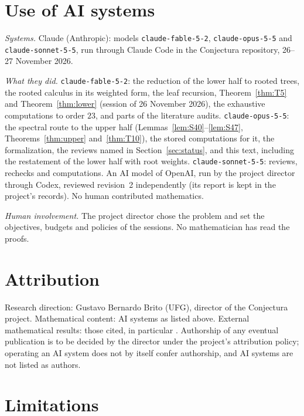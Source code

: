 \documentclass[11pt]{amsart}
\theoremstyle{definition}
\theoremstyle{remark}
\begin{document}
\section*{Use of AI systems}

\emph{Systems.} Claude (Anthropic): models \nolinkurl{claude-fable-5-2},
\nolinkurl{claude-opus-5-5} and \nolinkurl{claude-sonnet-5-5}, run through
Claude Code in the Conjectura repository, 26--27 November 2026.

\emph{What they did.} \nolinkurl{claude-fable-5-2}: the reduction of the lower
half to rooted trees, the rooted calculus in its weighted form, the leaf
recursion, Theorem~\ref{thm:T5} and Theorem~\ref{thm:lower} (session of
26 November 2026), the exhaustive computations to order $23$, and parts of
the literature audits. \nolinkurl{claude-opus-5-5}: the spectral route to the
upper half (Lemmas~\ref{lem:S40}--\ref{lem:S47}, Theorems~\ref{thm:upper}
and~\ref{thm:T10}), the stored computations for it, the formalization, the
reviews named in Section~\ref{sec:status}, and this text, including the
restatement of the lower half with root weights. \nolinkurl{claude-sonnet-5-5}:
reviews, rechecks and computations. An AI model of OpenAI, run by the
project director through Codex, reviewed revision~2 independently (its
report is kept in the project's records). No human contributed mathematics.

\emph{Human involvement.} The project director chose the problem and set the
objectives, budgets and policies of the sessions. No mathematician has read
the proofs.

\section*{Attribution}

Research direction: Gustavo Bernardo Brito (UFG), director of the Conjectura
project. Mathematical content: AI systems as listed above. External
mathematical results: those cited, in particular
\cite{GL78,GP71,AAB,Col89,Dar64,Pit97,Mer90,AMW}. Authorship of any eventual
publication is to be decided by the director under the project's
attribution policy; operating an AI system does not by itself confer
authorship, and AI systems are not listed as authors.

\section*{Limitations}
\end{document}
